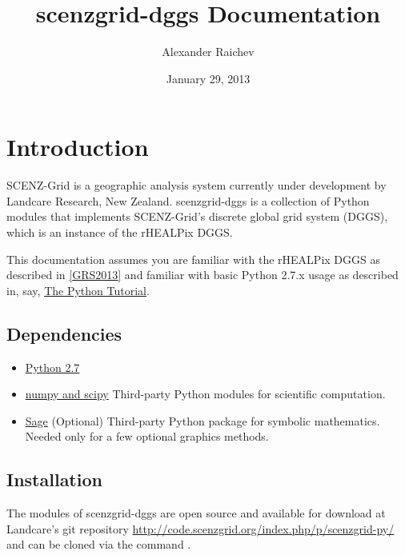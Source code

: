 \documentclass[a4paper,12ptopenany,oneside]{sphinxmanual}
\title{scenzgrid-dggs Documentation}
\date{January 29, 2013}
\author{Alexander Raichev}
\begin{document}
\maketitle
\tableofcontents
{}\label{index::doc}



\chapter{Introduction}
\label{introduction:introduction}\label{introduction:welcome-to-scenzgrid-dggs-s-documentation}\label{introduction::doc}
SCENZ-Grid is a geographic analysis system currently under development by Landcare Research, New Zealand.
scenzgrid-dggs is a collection of Python modules that implements SCENZ-Grid's discrete global grid system (DGGS), which is an instance of the rHEALPix DGGS.

This documentation assumes you are familiar with the rHEALPix DGGS as described in {\hyperref[introduction:grs2013]{{[}GRS2013{]}}} and familiar with basic Python 2.7.x usage as described in, say, \href{http://docs.python.org/2/tutorial/}{The Python Tutorial}.


\section{Dependencies}
\label{introduction:dependencies}\begin{itemize}
\item {} 
\href{http://python.org/}{Python 2.7}

\item {} 
\href{http://www.scipy.org/}{numpy and scipy}
Third-party Python modules for scientific computation.

\item {} 
\href{http://www.sagemath.org}{Sage}
(Optional) Third-party Python package for symbolic mathematics.
Needed only for a few optional graphics methods.

\end{itemize}


\section{Installation}
\label{introduction:installation}
The modules of scenzgrid-dggs are open source and available for download at Landcare's git repository \href{http://code.scenzgrid.org/index.php/p/scenzgrid-py/}{http://code.scenzgrid.org/index.php/p/scenzgrid-py/} and can be cloned via the command .
\end{document}
